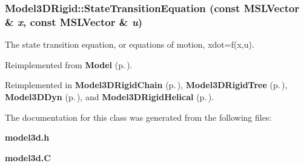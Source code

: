 \subsubsection{ Model3DRigid::State\-Transition\-Equation (const {\bf MSLVector} \& {\em x}, const {\bf MSLVector} \& {\em u})\hspace{0.3cm}{\tt  [virtual]}}\label{classModel3DRigid_a3}


The state transition equation, or equations of motion, xdot=f(x,u).



Reimplemented from {\bf Model} {\rm (p.\,\pageref{classModel_a3})}.

Reimplemented in {\bf Model3DRigid\-Chain} {\rm (p.\,\pageref{classModel3DRigidChain_a2})}, {\bf Model3DRigid\-Tree} {\rm (p.\,\pageref{classModel3DRigidTree_a2})}, {\bf Model3DDyn} {\rm (p.\,\pageref{classModel3DDyn_a2})}, and {\bf Model3DRigid\-Helical} {\rm (p.\,\pageref{classModel3DRigidHelical_a2})}.

The documentation for this class was generated from the following files:\begin{CompactItemize}
\item 
{\bf model3d.h}\item 
{\bf model3d.C}\end{CompactItemize}
